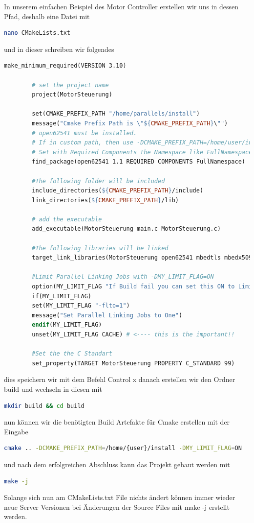 	In unserem einfachen Beispiel des Motor Controller erstellen wir uns in dessen Pfad, deshalb eine Datei mit
	\begin{lstlisting}[language=Bash]
		nano CMakeLists.txt
	\end{lstlisting}
	und in dieser schreiben wir folgendes
	\begin{lstlisting}[language=make]
		make_minimum_required(VERSION 3.10)
		
		# set the project name
		project(MotorSteuerung)
		
		set(CMAKE_PREFIX_PATH "/home/parallels/install")
		message("Cmake Prefix Path is \"${CMAKE_PREFIX_PATH}\"")
		# open62541 must be installed.
		# If in custom path, then use -DCMAKE_PREFIX_PATH=/home/user/install
		# Set with Required Components the Namespace like FullNamespace or ReducedNamespace
		find_package(open62541 1.1 REQUIRED COMPONENTS FullNamespace)
		
		#The following folder will be included
		include_directories(${CMAKE_PREFIX_PATH}/include)
		link_directories(${CMAKE_PREFIX_PATH}/lib)
		
		# add the executable
		add_executable(MotorSteuerung main.c MotorSteuerung.c)
		
		#The following libraries will be linked
		target_link_libraries(MotorSteuerung open62541 mbedtls mbedx509 mbedcrypto)
		
		#Limit Parallel Linking Jobs with -DMY_LIMIT_FLAG=ON
		option(MY_LIMIT_FLAG "If Build fail you can set this ON to Limit parralel Linking Jobs to One" OFF) #OFF by default
		if(MY_LIMIT_FLAG)
		set(MY_LIMIT_FLAG "-flto=1")
		message("Set Parallel Linking Jobs to One")
		endif(MY_LIMIT_FLAG)
		unset(MY_LIMIT_FLAG CACHE) # <---- this is the important!!
		
		#Set the the C Standart
		set_property(TARGET MotorSteuerung PROPERTY C_STANDARD 99)
	\end{lstlisting}
	dies speichern wir mit dem Befehl Control x 
	danach erstellen wir den Ordner build und wechseln in diesen mit
	\begin{lstlisting}[language=Bash]
		mkdir build && cd build
	\end{lstlisting}
	nun können wir die benötigten Build Artefakte für Cmake erstellen mit der Eingabe
	\begin{lstlisting}[language=Bash]
		cmake .. -DCMAKE_PREFIX_PATH=/home/{user}/install -DMY_LIMIT_FLAG=ON
	\end{lstlisting}
	und nach dem erfolgreichen Abschluss kann das Projekt gebaut werden mit
	\begin{lstlisting}[language=Bash]
		make -j
	\end{lstlisting}
	Solange sich nun am CMakeLists.txt File nichts ändert können immer wieder neue Server Versionen bei Änderungen der Source Files mit make -j erstellt werden.
	
